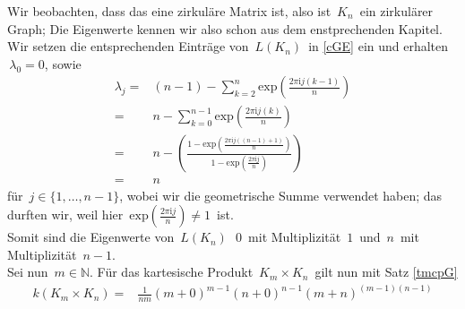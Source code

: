 Wir beobachten, dass das eine zirkuläre Matrix ist, also ist $\,K_n\,$ ein zirkulärer Graph;
Die Eigenwerte kennen wir also schon aus dem enstprechenden Kapitel. Wir setzen die entsprechenden Einträge von $\,L(K_n)\,$ in \ref{cGE} ein und erhalten $\,\lambda_0=0$,\; sowie
\begin{equation}
\begin{split}
 \lambda_j = {} & (n-1) - \sum_{k=2}^{n}\mathrm{exp}{\left(\frac{2\pi \mathrm{i}j(k-1)}{n}\right)}\\
 ={} & n - \sum_{k=0}^{n-1}\mathrm{exp}{\left(\frac{2\pi \mathrm{i}j(k)}{n}\right)}\\
 ={} & n - \left( \frac{1-\mathrm{exp}{\left(\frac{2\pi \mathrm{i}j((n-1)+1)}{n}\right)}}{1-\mathrm{exp}{\left(\frac{2\pi \mathrm{i}j}{n}\right)}} \right)\\
 ={}&n
 \end{split}
\end{equation}
für $\,j\in\{1,\ldots,n-1\}$,\; wobei wir die geometrische Summe verwendet haben; das durften wir, weil hier $\,\mathrm{exp}{\left(\frac{2\pi \mathrm{i}j}{n}\right)} \neq 1\,$ ist.\\
Somit sind die Eigenwerte von $\,L(K_n)\,$ $\,0\,$ mit Multiplizität $\,1\,$ und $\,n\,$ mit Multiplizität $\,n-1$.\; \\
Sei nun $\,m\in\mathbb{N}$.\; 
Für das kartesische Produkt $\,K_m\times K_n\,$ gilt nun mit Satz \ref{tmcpG}
\begin{equation}
 \begin{split}
  \mathit{k}(K_m\times K_n)={}&\frac{1}{nm}(m+0)^{m-1}(n+0)^{n-1}(m+n)^{(m-1)(n-1)}
 \end{split}
\end{equation}

